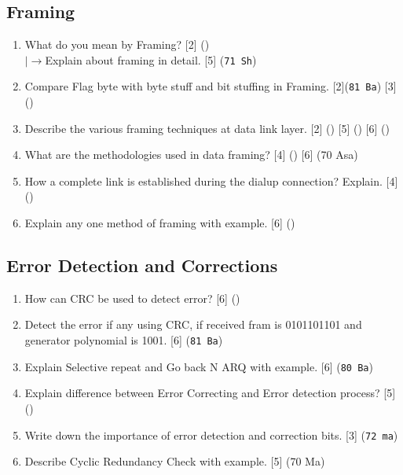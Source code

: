 \documentclass[12pt]{article}
\newcommand{\lb}{\\$\left|\rightarrow\right.$}
\begin{document}
	\subsection{Framing}
		\begin{enumerate}[noitemsep, topsep=0pt]
			\item What do you mean by Framing? \hfill [2] () 
			\lb Explain about framing in detail. \hfill [5] (\texttt{71 Sh})

			\item Compare Flag byte with byte stuff and bit stuffing in Framing. \hfill [2](\texttt{81 Ba}) [3] () 

			\item Describe the various framing techniques at data link layer. \hfill [2] () [5] () [6] ()

			\item What are the methodologies used in data framing? \hfill [4] () [6] (70 Asa)

			\item How a complete link is established during the dialup connection? Explain. \hfill[4] ()

			\item Explain any one method of framing with example. \hfill [6] ()
		\end{enumerate}

	\subsection{Error Detection and Corrections}
		\begin{enumerate}[noitemsep, topsep=0pt]
			\item How can CRC be used to detect error? \hfill [6] ()
			
			\item Detect the error if any using CRC, if received fram is 0101101101 and generator polynomial is 1001. \hfill [6] (\texttt{81 Ba})

			\item Explain Selective repeat and Go back N ARQ with example. \hfill [6] (\texttt{80 Ba})

			\item Explain difference between Error Correcting and Error detection process? \hfill [5] ()

			\item Write down the importance of error detection and correction bits. \hfill [3] (\texttt{72 ma})

			\item Describe Cyclic Redundancy Check with example. \hfill [5] (70 Ma)
		\end{enumerate}
\end{document}
